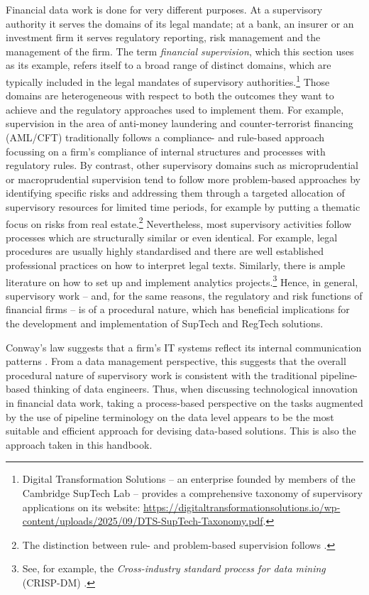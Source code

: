 \documentclass[a4paper, 11pt]{report}
\begin{document}
Financial data work is done for very different purposes. At a supervisory authority it serves the domains of its legal mandate; at a bank, an insurer or an investment firm it serves regulatory reporting, risk management and the management of the firm. The term \emph{financial supervision}, which this section uses as its example, refers itself to a broad range of distinct domains, which are typically included in the legal mandates of supervisory authorities.\footnote{Digital Transformation Solutions -- an enterprise founded by members of the Cambridge SupTech Lab -- provides a comprehensive taxonomy of supervisory applications on its website: \url{https://digitaltransformationsolutions.io/wp-content/uploads/2025/09/DTS-SupTech-Taxonomy.pdf}.} Those domains are heterogeneous with respect to both the outcomes they want to achieve and the regulatory approaches used to implement them. For example, supervision in the area of  anti-money laundering and counter-terrorist financing (AML/CFT) traditionally follows a compliance- and rule-based approach focussing on a firm's compliance of internal structures and processes with regulatory rules. By contrast, other supervisory domains such as microprudential or macroprudential supervision tend to follow more problem-based approaches by identifying specific risks and addressing them through a targeted allocation of supervisory resources for limited time periods, for example by putting a thematic focus on risks from real estate.\footnote{The distinction between rule- and problem-based supervision follows \textcite{Sparrow.2008, Sparrow.2020}.} Nevertheless, most supervisory activities follow processes which are structurally similar or even identical. For example, legal procedures are usually highly standardised and there are well established professional practices on how to interpret legal texts. Similarly, there is ample literature on how to set up and implement analytics projects.\footnote{See, for example, the \emph{Cross-industry standard process for data mining} (CRISP-DM) \parencite{Schroeer.2021}.} Hence, in general, supervisory work -- and, for the same reasons, the regulatory and risk functions of financial firms -- is of a procedural nature, which has beneficial implications for the development and implementation of SupTech and RegTech solutions.

Conway's law suggests that a firm's IT systems reflect its internal communication patterns \parencite{Conway.1968}. From a data management perspective, this suggests that the overall procedural nature of supervisory work is consistent with the traditional pipeline-based thinking of data engineers. Thus, when discussing technological innovation in financial data work, taking a process-based perspective on the tasks augmented by the use of pipeline terminology on the data level appears to be the most suitable and efficient approach for devising data-based solutions. This is also the approach taken in this handbook.
\end{document}
